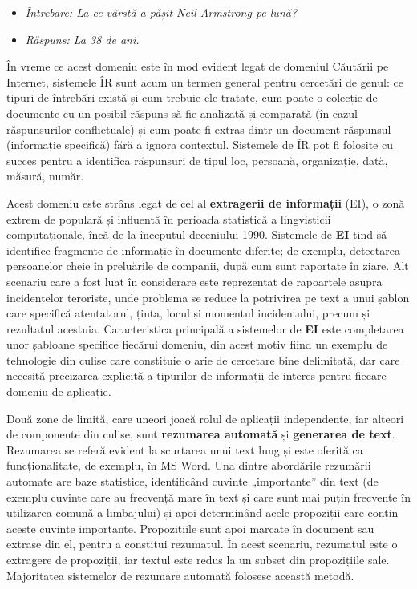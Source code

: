 \begin{multicols}{2}
\begin{itemize}
\item[]\textit{Întrebare: La ce vârstă a pășit Neil Armstrong pe lună?}
\item[]\textit{Răspuns: La 38 de ani.}
\end{itemize}

În vreme ce acest domeniu este în mod evident legat de domeniul Căutării pe Internet, sistemele ÎR sunt acum un termen general pentru cercetări de genul: ce tipuri de întrebări există și cum trebuie ele tratate, cum poate o colecție de documente cu un posibil răspuns să fie analizată și comparată (în cazul răspunsurilor conflictuale) și cum poate fi extras dintr-un document răspunsul (informație specifică) fără a ignora contextul. Sistemele de ÎR pot fi folosite cu succes pentru a identifica răspunsuri de tipul loc, persoană, organizație, dată, măsură, număr.

Acest domeniu este strâns legat de cel al \textbf{extragerii de informații} (EI), o zonă extrem de populară și influentă în perioada statistică a lingvisticii computaționale, încă de la începutul deceniului 1990. Sistemele de \textbf{EI} tind să identifice fragmente de informație în documente diferite; de exemplu, detectarea persoanelor cheie în preluările de companii, după cum sunt raportate în ziare. Alt scenariu care a fost luat în considerare este reprezentat de rapoartele asupra incidentelor teroriste, unde problema se reduce la potrivirea pe text a unui șablon care specifică atentatorul, ținta, locul și momentul incidentului, precum și rezultatul acestuia. Caracteristica principală a sistemelor de \textbf{EI} este completarea unor șabloane specifice fiecărui domeniu, din acest motiv fiind un exemplu de tehnologie din culise care constituie o arie de cercetare bine delimitată, dar care necesită precizarea explicită a tipurilor de informații de interes pentru fiecare domeniu de aplicație.

Două zone de limită, care uneori joacă rolul de aplicații independente, iar alteori de componente din culise, sunt \textbf{rezumarea automată} și \textbf{generarea de text}. Rezumarea se referă evident la scurtarea unui text lung și este oferită ca funcționalitate, de exemplu, în MS Word. Una dintre abordările rezumării automate are baze statistice, identificând cuvinte „importante” din text (de exemplu cuvinte care au frecvență mare în text și care sunt mai puțin frecvente în utilizarea comună a limbajului) și apoi determinând acele propoziții care conțin aceste cuvinte importante. Propozițiile sunt apoi marcate în document sau extrase din el, pentru a constitui rezumatul. În acest scenariu, rezumatul este o extragere de propoziții, iar textul este redus la un subset din propozițiile sale. Majoritatea sistemelor de rezumare automată folosesc această metodă. 


\end{multicols}
